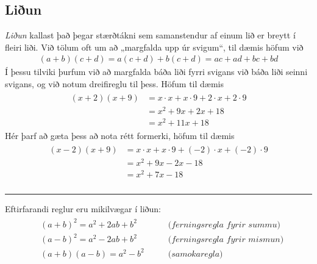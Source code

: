 \documentclass[a4paper,10pt,icelandic]{sphinxmanual}
\begin{document}
\subsection{Liðun}
\label{\detokenize{Kafli02:liun}}
\textit{Liðun} kallast það þegar stærðtákni sem samanstendur af einum lið er breytt í fleiri liði.
Við tölum oft um að „margfalda upp úr svigum“, til dæmis höfum við
\begin{equation*}
\begin{split}(a+b)(c+d)=a(c+d)+b(c+d)=ac+ad+bc+bd\end{split}
\end{equation*}
Í þessu tilviki þurfum við að margfalda báða liði fyrri svigans við báða liði seinni svigans, og við notum dreifireglu til þess. Höfum til dæmis
\begin{equation*}
\begin{split}\begin{aligned}
(x+2)(x+9)&=x \cdot x + x \cdot 9 + 2 \cdot x + 2 \cdot 9 \\
&= x^2 + 9x + 2x + 18\\
&= x^2 +11x +18
\end{aligned}\end{split}
\end{equation*}
Hér þarf að gæta þess að nota rétt formerki, höfum til dæmis
\begin{equation*}
\begin{split}\begin{aligned}
(x-2)(x+9)&=x \cdot x + x \cdot 9 + (-2) \cdot x + (-2) \cdot 9 \\
& = x^2 + 9x - 2x - 18 \\
& =x^2 +7x -18 \\
\end{aligned}\end{split}
\end{equation*}

\bigskip\hrule\bigskip


Eftirfarandi reglur eru mikilvægar í liðun:
\begin{equation*}
\begin{split}\begin{aligned}
& (a+b)^2=a^2+2ab+b^2 \qquad &\textit{(ferningsregla fyrir summu)} \\
& (a-b)^2=a^2-2ab+b^2 \qquad &\textit{(ferningsregla fyrir mismun)} \\
& (a+b)(a-b)=a^2-b^2 \qquad &\textit{(samokaregla)} \\
\end{aligned}\end{split}
\end{equation*}
\end{document}
